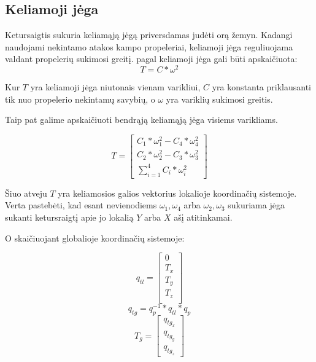 \documentclass[12pt, a4paper, lithuanian, final]{article}
\begin{document}
\subsection{Keliamoji jėga}

Ketursaigtis sukuria keliamąją jėgą priversdamas judėti orą žemyn.
Kadangi naudojami nekintamo atakos kampo propeleriai, keliamoji jėga reguliuojama valdant propelerių sukimosi greitį.
pagal \cite{gibiansky2010quadcopter,magnussen2011modeling} keliamoji jėga gali būti apskaičiuota:
\begin{equation}
	T = C * \omega^2
\end{equation}

Kur $T$ yra keliamoji jėga niutonais vienam varikliui, $C$ yra konstanta priklausanti tik nuo propelerio nekintamų savybių, o $\omega$ yra variklių sukimosi greitis.

Taip pat galime apskaičiuoti bendrąją keliamąją jėga visiems varikliams.

\begin{equation}
	T = \left[
		\begin{array}{c}
			C_{1} * \omega_{1}^2 - C_{4} * \omega_{4}^2 \\
			C_{2} * \omega_{2}^2 - C_{3} * \omega_{3}^2\\
			\displaystyle\sum_{i=1}^{4} C_i * \omega_i^2
		\end{array}
	\right]
\end{equation}

Šiuo atveju $T$ yra keliamosios galios vektorius lokalioje koordinačių sistemoje.
Verta pastebėti, kad esant nevienodiems $\omega_{1}, \omega_{4}$ arba $\omega_{2}, \omega_{3}$ sukuriama jėga sukanti ketursraigtį apie jo lokalią $Y$ arba $X$ ašį atitinkamai.

O skaičiuojant globalioje koordinačių sistemoje:

\begin{equation}
q_{tl} = \left[
		\begin{array}{c}
			0\\
			T_x\\
			T_y\\
			T_z\\
		\end{array}
		\right]
\end{equation}
\begin{equation}
	q_{tg} = q_{p}^{-1} * q_{tl} * q_{p}
\end{equation}
\begin{equation}
	T_g = \left[
		\begin{array}{c}
			q_{tg_x} \\
			q_{tg_y} \\
			q_{tg_z}
		\end{array}
	\right]
\end{equation}
\end{document}
